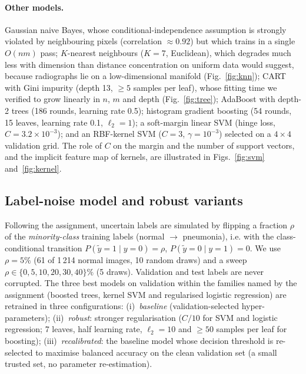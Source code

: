 \documentclass[11pt,a4paper]{article}
\makeatletter
\newcommand{\ie}{i.e.\@\xspace}
\makeatother
\begin{document}
\paragraph{Other models.} Gaussian naive Bayes, whose conditional-independence assumption is strongly violated by
neighbouring pixels (correlation $\approx0.92$) but which trains in a single $O(nm)$ pass; $K$-nearest neighbours
($K=7$, Euclidean), which degrades much less with dimension than distance concentration on uniform data would suggest,
because radiographs lie on a low-dimensional manifold (Fig.~\ref{fig:knn}); CART with Gini impurity
(depth 13, $\geq5$ samples per leaf), whose fitting time we verified to grow linearly in $n$, $m$ and depth
(Fig.~\ref{fig:tree}); AdaBoost with depth-2 trees (186 rounds, learning rate 0.5); histogram gradient boosting
(54 rounds, 15 leaves, learning rate 0.1, $\ell_2=1$); a soft-margin linear SVM (hinge loss, $C=3.2\times10^{-3}$);
and an RBF-kernel SVM ($C=3$, $\gamma=10^{-3}$) selected on a $4\times4$ validation grid. The role of $C$ on the
margin and the number of support vectors, and the implicit feature map of kernels, are illustrated in
Figs.~\ref{fig:svm} and~\ref{fig:kernel}.

\subsection{Label-noise model and robust variants}
Following the assignment, uncertain labels are simulated by flipping a fraction $\rho$ of the \emph{minority-class}
training labels (normal $\to$ pneumonia), \ie with the class-conditional transition
$P(\tilde y=1\mid y=0)=\rho$, $P(\tilde y=0\mid y=1)=0$. We use $\rho=5\%$ (61 of 1\,214 normal images, 10 random
draws) and a sweep $\rho\in\{0,5,10,20,30,40\}\%$ (5 draws). Validation and test labels are never corrupted. The three
best models on validation within the families named by the assignment (boosted trees, kernel SVM and regularised
logistic regression) are retrained in three configurations:
(i)~\emph{baseline} (validation-selected hyper-parameters);
(ii)~\emph{robust}: stronger regularisation ($C/10$ for SVM and logistic regression; 7 leaves, half learning rate,
$\ell_2=10$ and $\geq50$ samples per leaf for boosting);
(iii)~\emph{recalibrated}: the baseline model whose decision threshold is re-selected to maximise balanced accuracy on
the clean validation set (a small trusted set, no parameter re-estimation).
\end{document}
